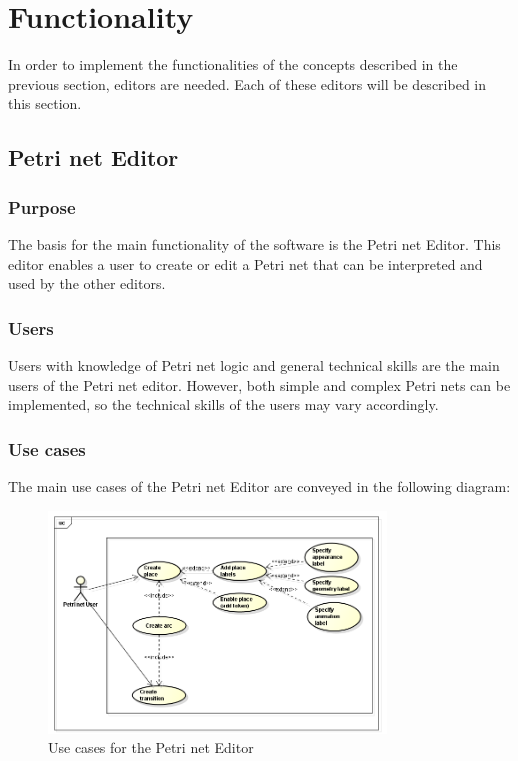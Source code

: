 \section{Functionality}

In order to implement the functionalities of the concepts described in the previous section, editors are needed. Each of these editors will be described in this section.

\subsection{Petri net Editor}

\subsubsection{Purpose}
The basis for the main functionality of the software is the Petri net Editor. This editor enables a user to create or edit a Petri net that can be interpreted and used by the other editors. 

\subsubsection{Users}
Users with knowledge of Petri net logic and general technical skills are the main users of the Petri net editor. However, both simple and complex Petri nets can be implemented, so the technical skills of the users may vary accordingly. 


\subsubsection{Use cases}
The main use cases of the Petri net Editor are conveyed in the following diagram:

\begin{figure}[htp]
\begin{center}
  \includegraphics[width=0.8\textwidth]{image/PetrinetUC.png}
  \caption{Use cases for the Petri net Editor}
  \label{fig:petrinet_editor_usecases}
\end{center}
\end{figure}


